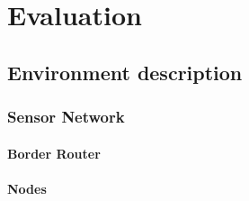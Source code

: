 \section{Evaluation}

\subsection{Environment description}


\subsubsection{Sensor Network}


\paragraph{Border Router}

\paragraph{Nodes}



